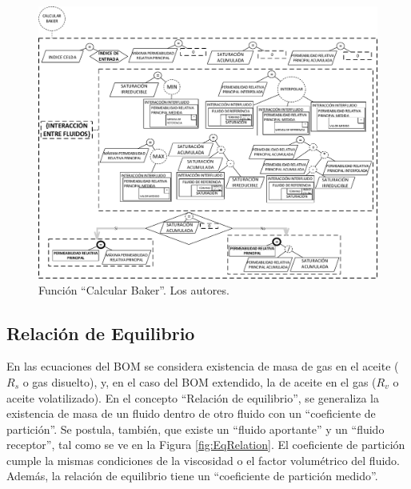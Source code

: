 \begin{figure}[h]
	\centering%
	\includegraphics[width=0.9\linewidth]{Fig/Baker.pdf}%
	\caption[Función ``Calcular Baker''.]{Función ``Calcular Baker''. Los autores.} \label{fig:Baker}
\end{figure}

\subsection{Relación de Equilibrio}\label{subsec:PS_Equilibrium}
En las ecuaciones del BOM se considera existencia de masa de gas en el aceite ($R_{s}$ o gas disuelto), y, en el caso del BOM extendido, la de aceite en el gas ($R_{v}$ o aceite volatilizado). En el concepto ``Relación de equilibrio'', se generaliza la existencia de masa de un fluido dentro de otro fluido con un ``coeficiente de partición''. Se postula, también, que existe un ``fluido aportante'' y un ``fluido receptor'', tal como se ve en la Figura \ref{fig:EqRelation}. El coeficiente de partición cumple la mismas condiciones de la viscosidad o el factor volumétrico del fluido. Además, la relación de equilibrio tiene un ``coeficiente de partición medido''.\\

